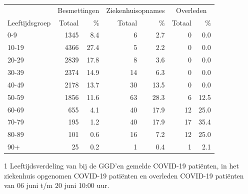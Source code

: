 \documentclass[
  english,
  man,floatsintext]{apa6}
\begin{document}
\begin{table}
\centering\begingroup\fontsize{11}{13}\selectfont

\begin{threeparttable}
\begin{tabular}{lrrrrrr}
\toprule
\multicolumn{1}{c}{ } & \multicolumn{2}{c}{Besmettingen} & \multicolumn{2}{c}{Ziekenhuisopnames} & \multicolumn{2}{c}{Overleden} \\
\cmidrule(l{3pt}r{3pt}){2-3} \cmidrule(l{3pt}r{3pt}){4-5} \cmidrule(l{3pt}r{3pt}){6-7}
Leeftijdsgroep & Totaal & \% & Totaal & \% & Totaal & \%\\
\midrule
0-9 & 1345 & 8.4 & 6 & 2.7 & 0 & 0.0\\
10-19 & 4366 & 27.4 & 5 & 2.2 & 0 & 0.0\\
20-29 & 2839 & 17.8 & 8 & 3.6 & 0 & 0.0\\
30-39 & 2374 & 14.9 & 14 & 6.3 & 0 & 0.0\\
40-49 & 2178 & 13.7 & 30 & 13.5 & 0 & 0.0\\
50-59 & 1856 & 11.6 & 63 & 28.3 & 6 & 12.5\\
60-69 & 655 & 4.1 & 40 & 17.9 & 12 & 25.0\\
70-79 & 195 & 1.2 & 40 & 17.9 & 17 & 35.4\\
80-89 & 101 & 0.6 & 16 & 7.2 & 12 & 25.0\\
90+ & 25 & 0.2 & 1 & 0.4 & 1 & 2.1\\
\bottomrule
\end{tabular}
\begin{tablenotes}
\item[1] Leeftijdsverdeling van bij de GGD’en gemelde COVID-19 patiënten, in het ziekenhuis opgenomen COVID-19 patiënten en overleden COVID-19 patiënten van 06 juni t/m 20 juni 10:00 uur.
\end{tablenotes}
\end{threeparttable}
\endgroup{}
\end{table}

\newpage
\end{document}
